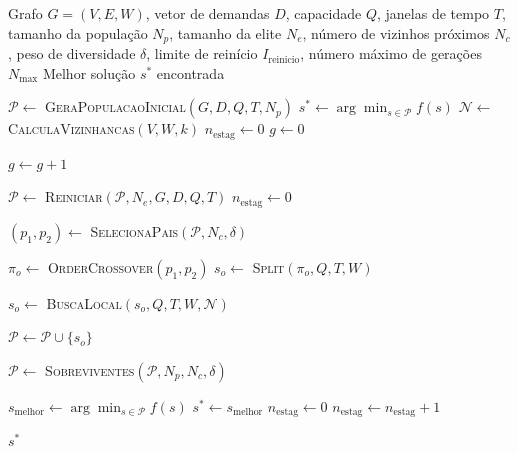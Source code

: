 \begin{algorithm}[H]
\caption{Busca Genética Híbrida para VRPTW}
\label{alg:hgs}
\begin{algorithmic}[1]
\Require Grafo $G=(V,E,W)$, vetor de demandas $D$, capacidade $Q$, janelas de tempo $T$, tamanho da população $N_p$, tamanho da elite $N_e$, número de vizinhos próximos $N_c$, peso de diversidade $\delta$, limite de reinício $I_{\text{reinicio}}$, número máximo de gerações $N_{\max}$
\Ensure Melhor solução $s^*$ encontrada

    \State $\mathcal{P} \leftarrow$ \textsc{GeraPopulacaoInicial}$(G, D, Q, T, N_p)$ \label{ln:hgs_init_pop}
    \State $s^* \leftarrow \arg\min_{s \in \mathcal{P}} f(s)$ \label{ln:hgs_init_best}
    \State $\mathcal{N} \leftarrow$ \textsc{CalculaVizinhancas}$(V, W, k)$ \label{ln:hgs_calc_neighbors}
    \State $n_{\text{estag}} \leftarrow 0$ \label{ln:hgs_init_stag}
    \State $g \leftarrow 0$ \label{ln:hgs_init_gen}
    
     \label{ln:hgs_main_loop}
        \State $g \leftarrow g + 1$ \label{ln:hgs_inc_gen}
        
         \label{ln:hgs_check_restart}
            \State $\mathcal{P} \leftarrow$ \textsc{Reiniciar}$(\mathcal{P}, N_e, G, D, Q, T)$ \label{ln:hgs_restart}
            \State $n_{\text{estag}} \leftarrow 0$ \label{ln:hgs_reset_stag}
        \EndIf
        
        \State $(p_1, p_2) \leftarrow$ \textsc{SelecionaPais}$(\mathcal{P}, N_c, \delta)$ \label{ln:hgs_select_parents}
        
        \State $\pi_o \leftarrow$ \textsc{OrderCrossover}$(p_1, p_2)$ \label{ln:hgs_crossover}
        \State $s_o \leftarrow$ \textsc{Split}$(\pi_o, Q, T, W)$ \label{ln:hgs_split}
        
        \State $s_o \leftarrow$ \textsc{BuscaLocal}$(s_o, Q, T, W, \mathcal{N})$ \label{ln:hgs_local_search}
        
        \State $\mathcal{P} \leftarrow \mathcal{P} \cup \{s_o\}$ \label{ln:hgs_add_offspring}
        
        \State $\mathcal{P} \leftarrow$ \textsc{Sobreviventes}$(\mathcal{P}, N_p, N_c, \delta)$ \label{ln:hgs_survivors}
        
        \State $s_{\text{melhor}} \leftarrow \arg\min_{s \in \mathcal{P}} f(s)$ \label{ln:hgs_best_current}
         \label{ln:hgs_check_improvement}
            \State $s^* \leftarrow s_{\text{melhor}}$ \label{ln:hgs_update_best}
            \State $n_{\text{estag}} \leftarrow 0$ \label{ln:hgs_reset_stag2}
        \Else
            \State $n_{\text{estag}} \leftarrow n_{\text{estag}} + 1$ \label{ln:hgs_inc_stag}
        \EndIf
    \EndWhile
    
    \State \Return $s^*$ \label{ln:hgs_return}
\end{algorithmic}
\end{algorithm}

